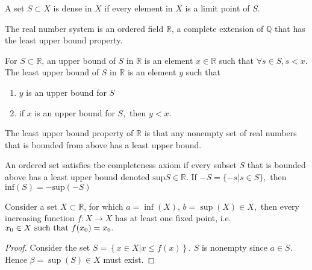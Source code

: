 \begin{definition}
    A set $S\subset X$ is dense in $X$ if every element in $X$ is a limit point of $S.$
\end{definition}

The real number system is an ordered field $\mathbb{R}$, a complete extension of $\mathbb{Q}$ that has the least upper bound property. 

\begin{definition}
    For $S\subset \mathbb{R}$, an upper bound of $S$ in $\mathbb{R}$ is an element $x\in\mathbb{R}$ such that $\forall s\in S, s<x.$ The least upper bound of $S$ in $\mathbb{R}$ is an element $y$ such that
    \begin{enumerate}
        \item $y$ is an upper bound for $S$
        \item if $x$ is an upper bound for $S,$ then $y<x.$
    \end{enumerate}
    The least upper bound property of $\mathbb{R}$ is that any nonempty set of real numbers that is bounded from above has a least upper bound.
\end{definition}

An ordered set satisfies the completeness axiom if every subset $S$ that is bounded above has a least upper bound denoted $\text{sup}S\in\mathbb{R}$. If $-S=\{-s|s\in S\},$ then $\text{inf}(S)=-\text{sup}(-S)$

\begin{theorem}
    Consider a set $X\subset\mathbb{R}$, for which $a=\inf(X),\,b=\sup(X)\in X,$ then every increasing function $f:X\rightarrow X$ has at least one fixed point, i.e. $x_0\in X\text{ such that } f(x_0)=x_0.$
\end{theorem}
\begin{proof}
    Consider the set $S=\left\{ x\in X | x\leq f(x) \right\}$. $S$ is nonempty since $a\in S.$ Hence $\beta=\sup(S)\in X$ must exist.

\end{proof}

